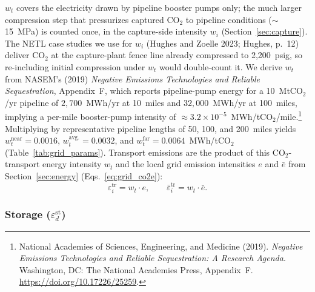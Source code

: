 \documentclass[11pt]{article}
\newcommand{\cotwo}{\ensuremath{\mathrm{CO_2}}}
\begin{document}
$w_t$ covers the electricity drawn by pipeline booster pumps only; the much larger compression step that pressurizes captured \cotwo{} to pipeline conditions (${\sim}$15~MPa) is counted once, in the capture-side intensity $w_i$ (Section~\ref{sec:capture}). The NETL case studies we use for $w_i$ (Hughes and Zoelle 2023; Hughes, p.~12) deliver \cotwo{} at the capture-plant fence line already compressed to 2{,}200~psig, so re-including initial compression under $w_t$ would double-count it. We derive $w_t$ from NASEM's (2019) \emph{Negative Emissions Technologies and Reliable Sequestration}, Appendix~F, which reports pipeline-pump energy for a 10~Mt\cotwo{}/yr pipeline of $2{,}700$~MWh/yr at 10~miles and $32{,}000$~MWh/yr at 100~miles, implying a per-mile booster-pump intensity of ${\approx}3.2\times10^{-5}$~MWh/t\cotwo{}/mile.\footnote{National Academies of Sciences, Engineering, and Medicine (2019). \emph{Negative Emissions Technologies and Reliable Sequestration: A Research Agenda}. Washington, DC: The National Academies Press, Appendix~F. \url{https://doi.org/10.17226/25259}.} Multiplying by representative pipeline lengths of 50, 100, and 200~miles yields $w_t^{\text{near}} = 0.0016$, $w_t^{\text{avg.}} = 0.0032$, and $w_t^{\text{far}} = 0.0064$~MWh/t\cotwo{} (Table~\ref{tab:grid_params}).
Transport emissions are the product of this \cotwo{}-transport energy intensity $w_t$ and the local grid emission intensities $e$ and $\bar{e}$ from Section~\ref{sec:energy} (Eqs.~\ref{eq:grid_co2e}):
%
\begin{equation}
  \varepsilon_i^{\text{tr}} = w_t \cdot e, \qquad
  \bar{\varepsilon}_i^{\text{tr}} = w_t \cdot \bar{e}.
  \label{eq:transport}
\end{equation}

\subsubsection{Storage ($\varepsilon_d^{\text{st}}$)}
\label{sec:storage}
\end{document}
